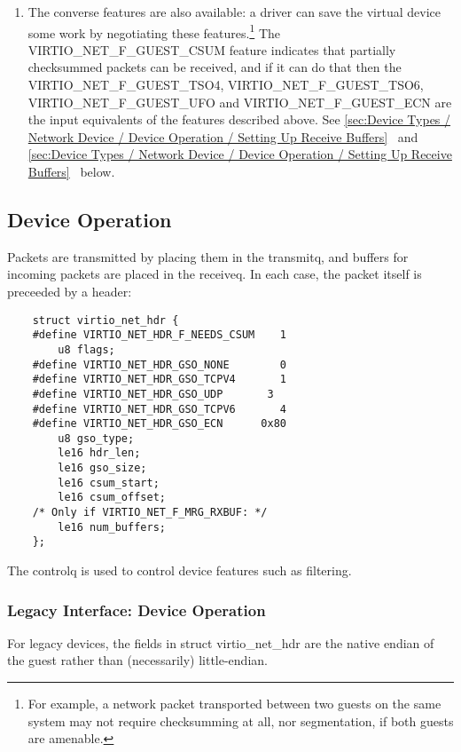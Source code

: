 \begin{enumerate}
\item The converse features are also available: a driver can save
  the virtual device some work by negotiating these features.\footnote{For example, a network packet transported between two guests on
the same system may not require checksumming at all, nor segmentation,
if both guests are amenable.
}
   The VIRTIO_NET_F_GUEST_CSUM feature indicates that partially
  checksummed packets can be received, and if it can do that then
  the VIRTIO_NET_F_GUEST_TSO4, VIRTIO_NET_F_GUEST_TSO6,
  VIRTIO_NET_F_GUEST_UFO and VIRTIO_NET_F_GUEST_ECN are the input
  equivalents of the features described above.
  See \ref{sec:Device Types / Network Device / Device Operation / Setting Up Receive Buffers}~ and \ref{sec:Device Types / Network Device / Device Operation / Setting Up Receive Buffers}~ below.
\end{enumerate}

\subsection{Device Operation}\label{sec:Device Types / Network Device / Device Operation}

Packets are transmitted by placing them in the transmitq, and
buffers for incoming packets are placed in the receiveq. In each
case, the packet itself is preceeded by a header:

\begin{lstlisting}
	struct virtio_net_hdr {
	#define VIRTIO_NET_HDR_F_NEEDS_CSUM    1
		u8 flags;
	#define VIRTIO_NET_HDR_GSO_NONE        0
	#define VIRTIO_NET_HDR_GSO_TCPV4       1
	#define VIRTIO_NET_HDR_GSO_UDP		 3
	#define VIRTIO_NET_HDR_GSO_TCPV6       4
	#define VIRTIO_NET_HDR_GSO_ECN      0x80
		u8 gso_type;
		le16 hdr_len;
		le16 gso_size;
		le16 csum_start;
		le16 csum_offset;
	/* Only if VIRTIO_NET_F_MRG_RXBUF: */
		le16 num_buffers;
	};
\end{lstlisting}

The controlq is used to control device features such as
filtering.

\subsubsection{Legacy Interface: Device Operation}\label{sec:Device Types / Network Device / Device Operation / Legacy Interface: Device Operation}
For legacy devices, the fields in struct virtio_net_hdr are the
native endian of the guest rather than (necessarily) little-endian.

